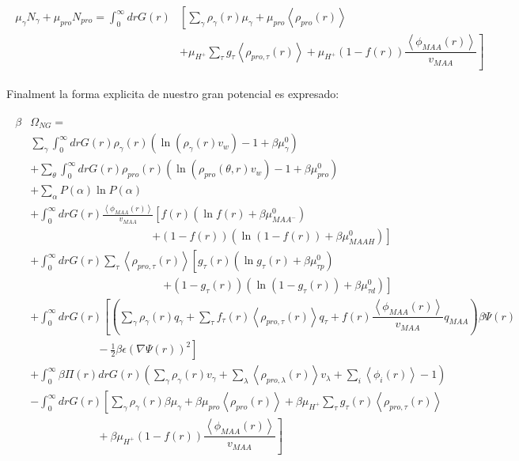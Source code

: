\begin{align}
	\begin{aligned}
		\mu_\gamma N_\gamma + \mu_{pro} N_{pro} =\int_0^\infty drG(r)&\left[\sum_{\gamma }{\rho_\gamma(r)\mu_\gamma}
		+ \mu_{pro} \left<\rho_{pro}(r)\right> \right. \\
		& \left. +\mu_{H^+}\sum_{\tau}{g_\tau\left<\rho_{pro,\tau}(r)\right> } +\mu_{H^+}(1-f(r))\dfrac{\left<\phi_{MAA}(r)\right>}{v_{MAA}}\right]
	\end{aligned}
\end{align}


Finalment la forma explicita de nuestro gran potencial es expresado:

\begin{align}
	\begin{aligned}
		\beta&\Omega_{NG}=\\&  \sum_{\gamma}\int_0^\infty{dr G(r)\rho_\gamma(r)\left(\ln \left(\rho_\gamma (r)v_w\right) -1 + \beta\mu^0_\gamma\right)} \\
		& +\sum_\theta \int_0^\infty{dr G(r)\rho_{pro}(r)\left(\ln (\rho_{pro}(\theta,r)v_w)-1 + \beta\mu^0_{pro} \right)} \\
		& + \sum_{\alpha}{P(\alpha)\ln P(\alpha)} \\
		& +\int_0^\infty drG(r) \frac{\left<\phi_{MAA}(r)\right>}{v_{MAA}} \left[f(r)(\ln f(r)+ \beta\mu^0_{MAA^-})\right.\\
		&\qquad \qquad \qquad\qquad \qquad \quad \left.+(1-f(r))(\ln (1-f(r))+\beta\mu^0_{MAAH})\right] \\
		& +\int_0^\infty drG(r)\sum_\tau \left<\rho_{pro,\tau}(r)\right> \left[g_\tau(r)(\ln g_\tau(r)+ \beta\mu^0_{\tau p})\right.\\
		&\qquad\qquad \qquad\qquad \qquad \qquad\left.+(1-g_\tau(r))(\ln (1-g_\tau(r))+\beta\mu^0_{\tau d})\right] \\
		& +  \int_0^\infty drG(r)\left[\left(\sum_{\gamma } {\rho_\gamma(r) q_\gamma + \sum_\tau{f_\tau(r) \left<\rho_{pro,\tau}(r)\right> q_\tau} +  f(r)\dfrac{\left<\phi_{MAA}(r)\right>}{v_{MAA}}q_{MAA}}\right)\beta\Psi(r) \right.\\  &\left. \hspace{6em}-\frac{1}{2}\beta\epsilon(\nabla\Psi(r))^2 \right]\\
		&+ \int_0^\infty \beta\Pi(r) drG(r){\left(\sum_{\gamma}\rho_\gamma(r) v_\gamma + \sum_{\lambda}{\left<\rho_{pro,\lambda}(r)\right>}{v_\lambda} + \sum_i\left<\phi_i(r)\right> -1\right)}\\
		& -\int_0^\infty drG(r)\left[\sum_{\gamma }{\rho_\gamma(r)\beta\mu_\gamma}
		+ \beta\mu_{pro} \left<\rho_{pro}(r)\right>
		+\beta\mu_{H^+}\sum_{\tau}{g_\tau(r)\left<\rho_{pro,\tau}(r)\right> } \right.\\
		& \left. \hspace{6em} +\beta\mu_{H^+}(1-f(r))\dfrac{\left<\phi_{MAA}(r)\right>}{v_{MAA}}\right]%
	\end{aligned}
	\label{eq:esf:potential-energy}
\end{align}


